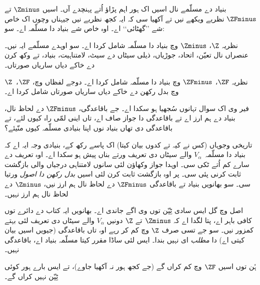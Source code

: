 \documentclass[../../../include/open-logic-section]{subfiles}
\begin{document}

بنیاد دے مسلّمے نال اسیں اک ہور اہم پڑاؤ اُتے پہنچدے آں۔ اسیں
$\Zminus$ تے $\ZFminus$ نظریے ویکھے نیں تے آکھیا سی کہ ایہ کجھ
نظریے نیں جیہناں وچوں اک خاص شے ’’گھٹائی‘‘ اے۔ اوہ خاص شے بنیاد دا
مسلّمہ اے۔ سو:

\begin{defn}
نظریہ $\Z$، $\Zminus$ وچ بنیاد دا مسلّمہ شامل کردا اے۔ سو اوہدے
مسلّمے ایہ نیں۔ عنصراں نال تعیّن، اتحاد، جوڑیاں، ذیلی سیٹاں دے سیٹ،
لامتناہیت، بنیاد، تے وکھ کرن دے خاکے دیاں ساریاں صورتاں۔

نظریہ $\ZF$، $\ZFminus$ وچ بنیاد دا مسلّمہ شامل کردا اے۔
دوجے لفظاں وچ، $\ZF$،~$\Z$ وچ بدل رکھن دے خاکے دیاں ساریاں صورتاں
شامل کردا اے۔
\end{defn}

فیر وی اک سوال تہانوں سُجھیا ہو سکدا اے۔ جے باقاعدگی، $\ZFminus$ دے
لحاظ نال، بنیاد دے ہم ارز اے تے باقاعدگی دا جواز صاف اے، تاں
اینی لمّی راہ کیوں لئے، تے باقاعدگی دی تھاں بنیاد نوں اپنا بنیادی مسلّمہ کیوں منّیئے؟

تاریخی وجوہاں (کس نے کیہ تے کدوں بیان کیتا) اک پاسے رکھ کے، بنیادی وجہ
ایہ اے کہ بنیاد دا مسلّمہ~$V_\alpha$ والے سیٹاں دی تعریف ورتے بناں پیش
ہو سکدا اے۔ اوہ تعریف  دے سارے کم اُتے ٹکی سی۔
اوہدا جواز وکھاؤن لئی سانوں لامتناہی درجیاں والی بازگشت ثابت کرنی پئی سی۔
پر اوہ بازگشت ثابت کرن لئی اسیں \emph{بدل رکھن دا اصول} ورتیا سی۔
سو بھانویں بنیاد تے باقاعدگی $\ZFminus$ دے لحاظ نال ہم ارز نیں،
$\Zminus$ دے لحاظ نال ہم ارز نہیں۔

اصل وچ گل ایس سادی ٹِپّن توں وی اگے جاندی اے۔ بھانویں ایہ کتاب دے
دائرے توں کافی باہر اے، پتا لگدا اے کہ $\Zminus$ تے $\Z$ دونیں
$V_\alpha$ والے سیٹاں دی تعریف لئی بہتے کمزور نیں۔ سو جے تسی صرف
$\Z$ وچ کم کر رہے او، تاں باقاعدگی (جیویں اسیں بیان کیتی اے) دا
\emph{مطلب} ای نہیں بندا۔ ایس لئی ساڈا مقرر کیتا مسلّمہ بنیاد اے، باقاعدگی نہیں۔

ہُن توں اسیں $\ZF$ وچ کم کراں گے (جے کجھ ہور نہ آکھیا جاوے)، تے
ایس بارے ہور کوئی ٹِپّن نہیں کراں گے۔
\end{document}
